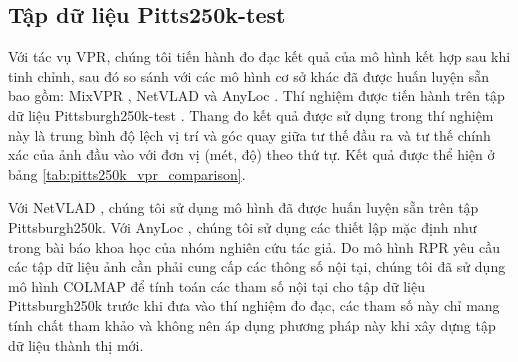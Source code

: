 \subsection*{Tập dữ liệu Pitts250k-test}
Với tác vụ VPR, chúng tôi tiến hành đo đạc kết quả của mô hình kết hợp sau khi tinh chỉnh, sau đó so sánh với các mô hình cơ sở khác đã được huấn luyện sẵn bao gồm: MixVPR \cite{alibey2023mixvpr}, NetVLAD \cite{arandjelovic2016netvlad} và AnyLoc \cite{keetha2023anyloc}. Thí nghiệm được tiến hành trên tập dữ liệu Pittsburgh250k-test \cite{6618963}. Thang đo kết quả được sử dụng trong thí nghiệm này là trung bình độ lệch vị trí và góc quay giữa tư thế đầu ra và tư thế chính xác của ảnh đầu vào với đơn vị (mét, độ) theo thứ tự. Kết quả được thể hiện ở bảng \ref{tab:pitts250k_vpr_comparison}.

Với NetVLAD \cite{arandjelovic2016netvlad}, chúng tôi sử dụng mô hình đã được huấn luyện sẵn trên tập Pittsburgh250k. Với AnyLoc \cite{keetha2023anyloc}, chúng tôi sử dụng các thiết lập mặc định như trong bài báo khoa học của nhóm nghiên cứu tác giả. Do mô hình RPR yêu cầu các tập dữ liệu ảnh cần phải cung cấp các thông số nội tại, chúng tôi đã sử dụng mô hình COLMAP\cite{schoenberger2016sfm} để tính toán các tham số nội tại cho tập dữ liệu Pittsburgh250k trước khi đưa vào thí nghiệm đo đạc, các tham số này chỉ mang tính chất tham khảo và không nên áp dụng phương pháp này khi xây dựng tập dữ liệu thành thị mới.

